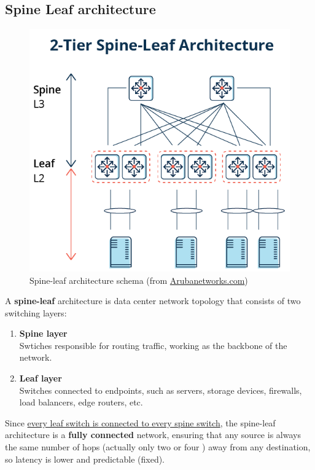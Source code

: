 \subsection{Spine Leaf architecture}
\begin{figure}[htbp]
   \centering
   \includegraphics{images/spineleaf.png}
   \caption{Spine-leaf architecture schema (from \href{https://www.arubanetworks.com/faq/what-is-spine-leaf-architecture/}{Arubanetworks.com})}
   \label{fig:}
\end{figure}
A \textbf{spine-leaf} architecture is data center network topology that consists of two switching layers:
\begin{enumerate}
   \item \textbf{Spine layer}\\
   Swtiches responsible for routing traffic, working as the backbone of the network.   
   \item \textbf{Leaf layer}\\
   Switches connected to endpoints, such as servers, storage devices, firewalls, load balancers, edge routers, etc.
\end{enumerate}
Since \ul{every leaf switch is connected to every spine switch}, the spine-leaf architecture is a \textbf{fully connected} network,
ensuring that any source is always the same number of hops (actually only two or four \smiley) away from any destination, so latency is lower and predictable (fixed).

